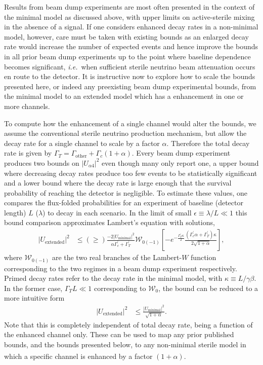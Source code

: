 \documentclass[11pt, a4paper]{article}
\def\ie{\emph{i.e.}}
\newcounter{CommentCount}
\newcommand{\marcom}[2]{\textsuperscript{\textcolor{#1}{\theCommentCount}}\marginpar{\textsuperscript{\textcolor{#1}{\theCommentCount}}\textcolor{#1}{{\small#1: #2}}}\stepcounter{CommentCount}}
\begin{document}
Results from beam dump experiments are most often presented in the context of
the minimal model as discussed above, with upper limits on active-sterile
mixing in the absence of a signal. If one considers enhanced decay rates in a
non-minimal model, however, care must be taken with existing bounds as an
enlarged decay rate would increase the number of expected events and hence
improve the bounds in all prior beam dump experiments up to the point where
baseline dependence becomes significant, \ie\ when sufficient sterile neutrino
beam attenuation occurs en route to the detector. It is instructive now to
explore how to scale the bounds presented here, or indeed any preexisting
beam dump experimental bounds, from the minimal model to an extended model
which has a enhancement in one or more channels.

To compute how the enhancement of a single channel would alter the bounds, we
assume the conventional sterile neutrino production mechanism, but allow the
decay rate for a single channel to scale by a factor $\alpha$. Therefore the
total decay rate is given by $\Gamma_T = \Gamma_\text{other}+\Gamma_c
(1+\alpha)$.  Every beam dump experiment produces two bounds on
$|U_{\alpha 4}|^2$ even though many only report one, a upper bound where
decreasing decay rates produce too few events to be statistically significant
and a lower bound where the decay rate is large enough that the survival
probability of reaching the detector is negligible. To estimate these values,
one compares the flux-folded probabilities for an experiment of baseline
(detector length) $L$ ($\lambda$) to decay in each scenario. In the limit of
small $\epsilon \equiv \lambda/L \ll 1$ this bound comparison approximates
Lambert's equation with solutions, 
%
\begin{align*} |U_\text{extended}|^2 &\leq (\geq) \frac{-2
|U_\text{minimal}|^2}{\alpha \Gamma^\prime_c +\Gamma^\prime_T}
\mathcal{W}_{0(-1)}\left[-e^{-\frac{\Gamma^\prime_T \kappa}{2}}
\frac{(\Gamma^\prime_c \alpha + \Gamma^\prime_T)\kappa}{2\sqrt{1+\alpha}}
\right], \end{align*}
% 
where $\mathcal{W}_{0(-1)}$ are the two real branches of the Lambert-$W$
function corresponding to the two regimes in a beam dump experiment
respectively. Primed decay rates refer to the decay rate in the minimal model,
with $\kappa \equiv L/\gamma \beta$. In the former case, $\Gamma_T L \ll 1$
corresponding to $\mathcal{W}_0$, the bound can be reduced to a more intuitive
form 
%
\begin{align*} |U_\text{extended}|^2 &\leq
\frac{|U_{\text{minimal}}|^2}{\sqrt{1+\alpha}}.  \end{align*} 
%
Note that this is completely independent of total decay rate, being a function
of the enhanced channel only. These can be used to map any prior published
bounds, and the bounds presented below, to any non-minimal sterile model in
which a specific channel is enhanced by a factor $(1+\alpha)$.\marcom{PB}{See S.'s comment.}
\end{document}
